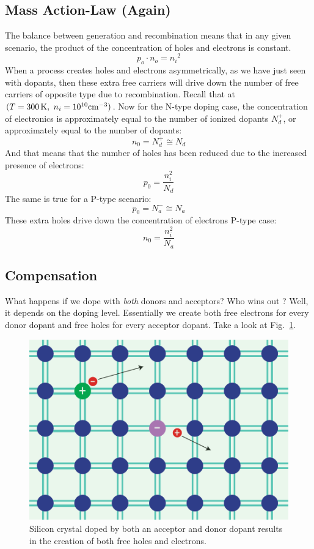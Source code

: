 \subsection{Mass Action-Law (Again)}
The balance between generation and recombination means that in any given scenario, the product of the concentration of holes and electrons is constant.  
\begin{equation}
        {p_o} \cdot {n_o} = {n_i}^2
\end{equation} 
When a process creates holes and electrons asymmetrically, as we have just seen with dopants, then these extra free carriers will drive down the number of free carriers of opposite type due to recombination.   Recall that at $(T = 300\,{\rm{K}},\,\,{n_i} = {10^{10}}{\rm{c}}{{\rm{m}}^{ - 3}})$.  Now for the N-type doping case, the concentration of electronics is approximately equal to the number of ionized dopants $N_d^+$, or approximately equal to the number of dopants:
\begin{equation}
{n_0} = N_d^+  \cong {N_d}
\end{equation}
And that means that the number of holes has been reduced due to the increased presence of electrons:
\begin{equation}
        p_0 = \frac{n_i^2}{N_d}
\end{equation}
The same is true for a P-type scenario:
\begin{equation}
{p_0} = N_a^ -  \cong {N_a} 
\end{equation}
These extra holes drive down the concentration of electrons 
{ P-type case:} \begin{equation}
        n_0 = \frac{n_i^2}{N_a}
\end{equation}
\subsection{Compensation}
What happens if we dope with \textit{both} donors and acceptors?  Who wins out ?  Well, it depends on the doping level.  Essentially we create both free electrons for every donor dopant and free holes for every acceptor dopant.  Take a look at Fig.~\ref{fig:silicon_dopant_both}.
\begin{figure}[tb]
\centering
\includegraphics[width=.5\columnwidth]{silicon_dopant_both}
\caption{Silicon crystal doped by both an acceptor and donor dopant results in the creation of both free holes and electrons.}
\label{fig:silicon_dopant_both}
\end{figure}

